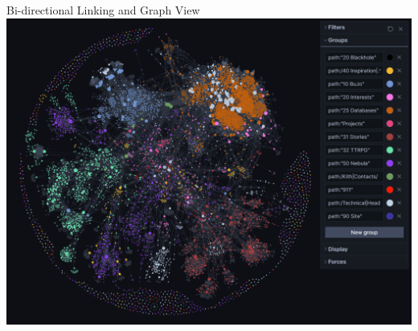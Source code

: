 \documentclass[10pt, xcolor=dvipsnames]{beamer}
\begin{document}
	\begin{frame}{Bi-directional Linking and Graph View}
	\centering
	\includegraphics[width=1\linewidth]{../latex-image/graphview}
	\end{frame}
	
\end{document}
